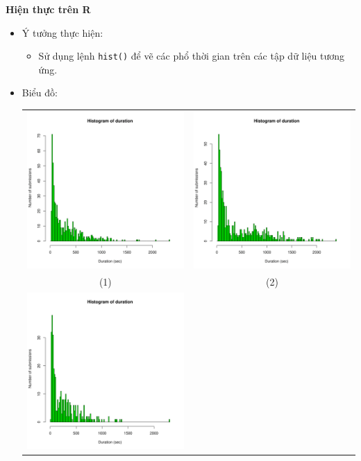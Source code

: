 \documentclass[a4paper]{article}
\theoremstyle{definition}
\begin{document}
\begin{enumerate}[a)]
    \bf Hiện thực trên R\normalfont
    \begin{itemize}
        \item Ý tưởng thực hiện:
        \begin{itemize}
            \item Sử dụng lệnh \texttt{hist()} để vẽ các phổ thời gian trên các tập dữ liệu tương ứng.
        \end{itemize}
        \item Biểu đồ:\\
        \begin{center}
            \begin{tabular}{c c}
                 \includegraphics[width = 6.9cm]{Images/img12-1-1.png} & \includegraphics[width = 6.9cm]{Images/img12-1-2.png} \\
                 (1) & (2) \\
                 \includegraphics[width = 6.9cm]{Images/img12-1-3.png} &

\end{tabular}
\end{center}
\end{itemize}
\end{enumerate}
\end{document}
